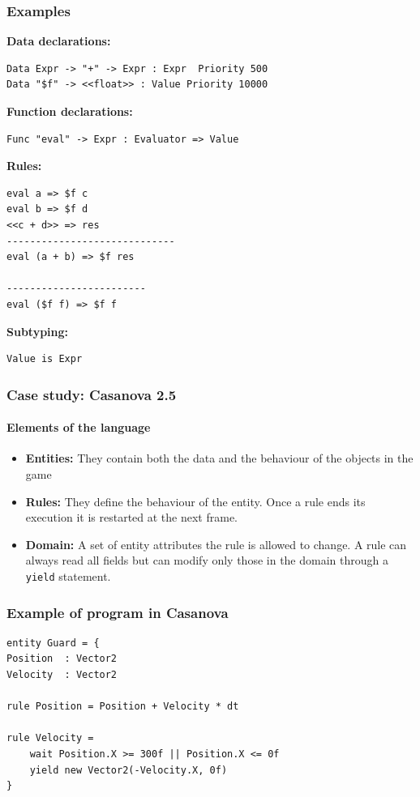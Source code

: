 \documentclass[10pt,a4paper]{beamer}
\begin{document}
\begin{frame}[fragile]
	\frametitle{Examples}
	
	\textbf{Data declarations:}
	\begin{lstlisting}
Data Expr -> "+" -> Expr : Expr  Priority 500
Data "$f" -> <<float>> : Value Priority 10000
	\end{lstlisting}
	
	\textbf{Function declarations:}
	\begin{lstlisting}
Func "eval" -> Expr : Evaluator => Value
	\end{lstlisting}
	
	\textbf{Rules:}
	\begin{lstlisting}
eval a => $f c
eval b => $f d
<<c + d>> => res
-----------------------------
eval (a + b) => $f res
	
------------------------
eval ($f f) => $f f
	\end{lstlisting}
	
	\textbf{Subtyping:}
	\begin{lstlisting}
Value is Expr
	\end{lstlisting}
\end{frame}

\begin{frame}
	\frametitle{Case study: Casanova 2.5}
	\framesubtitle{Elements of the language}
	
	\begin{itemize}
		\item \textbf{Entities:} They contain both the data and the behaviour of the objects in the game
		\item \textbf{Rules:} They define the behaviour of the entity. Once a rule ends its execution it is restarted at the next frame.
		\item \textbf{Domain:} A set of entity attributes the rule is allowed to change. A rule can always read all fields but can modify only those in the domain through a \texttt{yield} statement.
	\end{itemize}
\end{frame}

\begin{frame}[fragile]
	\frametitle{Example of program in Casanova}
	\begin{lstlisting}[basicstyle = \ttfamily\small]
entity Guard = {
Position  : Vector2
Velocity  : Vector2

rule Position = Position + Velocity * dt
	
rule Velocity =
	wait Position.X >= 300f || Position.X <= 0f
	yield new Vector2(-Velocity.X, 0f)
}
	\end{lstlisting}
\end{frame}
\end{document}
